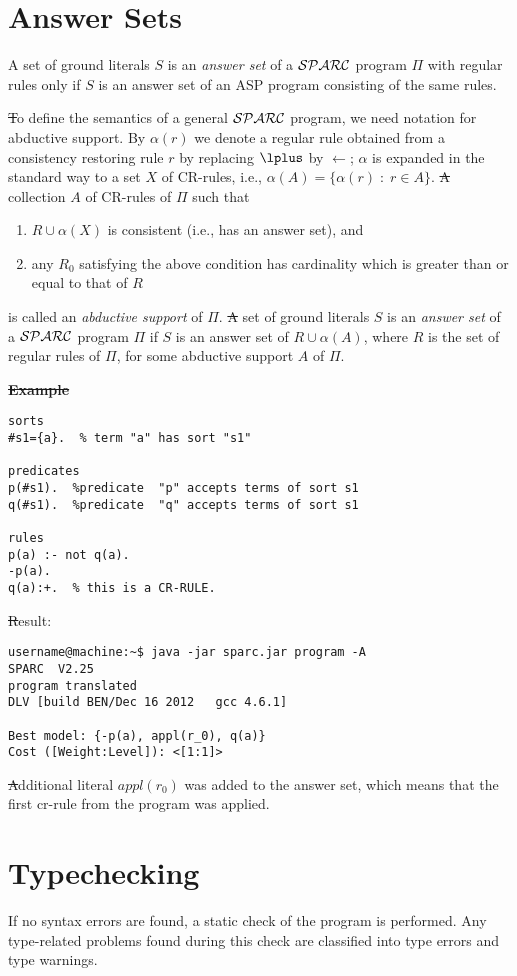 \documentclass[12pt, letterpaper]{article}
\begin{document}
 
\section{Answer Sets}
\noindent A set of ground literals $S$ is an {\em answer set} of a ${\cal SPARC}$ 
program $\Pi$ with regular rules only if $S$ is an answer set of an ASP program consisting of the same rules.

\st To define the semantics of a general ${\cal SPARC}$ program, we need notation for abductive support.
By $\alpha(r)$ we denote a regular rule
obtained from a consistency restoring rule $r$
by replacing $\lplus$ by $\leftarrow$;
$\alpha$ is expanded in the standard way to a set $X$ of CR-rules,
i.e., $\alpha(A) = \{\alpha(r)\; :\; r \in A\}$.
\st A %
collection $A$ of CR-rules of $\Pi$ such that 
\begin{enumerate}
\item $R \cup \alpha(X)$ is consistent (i.e., has an answer set), and
\item any $R_0$ satisfying the above condition has cardinality
which is greater than or equal to that of $R$
\end{enumerate}
is called an {\em abductive support} of $\Pi$.
\st A set of ground literals $S$ is an {\em answer set} of a ${\cal SPARC}$ program 
$\Pi$ if $S$ is an answer set of $R \cup \alpha(A)$, where $R$ is the set of regular rules of $\Pi$, for some abductive
support $A$ of $\Pi$.

\st \textbf{Example}
\begin{verbatim}
sorts
#s1={a}.  % term "a" has sort "s1"

predicates
p(#s1).  %predicate  "p" accepts terms of sort s1 
q(#s1).  %predicate  "q" accepts terms of sort s1 

rules
p(a) :- not q(a).
-p(a).
q(a):+.  % this is a CR-RULE. 
\end{verbatim}
\st Result:
\begin{verbatim}
username@machine:~$ java -jar sparc.jar program -A
SPARC  V2.25
program translated
DLV [build BEN/Dec 16 2012   gcc 4.6.1]

Best model: {-p(a), appl(r_0), q(a)}
Cost ([Weight:Level]): <[1:1]>
\end{verbatim}

\st Additional literal $appl(r_0)$ was added to the answer set, which means that the 
first cr-rule from the program was applied.

\section{Typechecking}
If no syntax errors are found, a static check of the program is performed. Any type-related problems found during this check are classified into type errors and type warnings.
\end{document}
